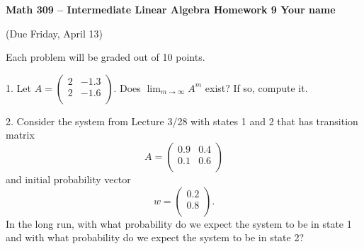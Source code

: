 \documentclass[12pt]{article} %
\begin{document}
 
\noindent
\textbf{Math 309 -- Intermediate Linear Algebra \quad 
Homework 9 \hfill Your name}\\
\begin{center}
  (Due Friday, April 13)
\end{center}
\medskip

Each problem will be graded out of 10 points.

\vspace{1cm}

\begin{flushleft}

1.  Let $A = \left(\begin{matrix}
                    2 & -1.3 \\
                    2 & -1.6\\
                   \end{matrix}\right).$  Does $\lim_{m \to \infty}\limits A^m$ exist?  If so, compute it.\\
                   
\vspace{.5cm}                   

2.  Consider the system from Lecture 3/28 with states 1 and 2 that has transition matrix \[A = \left(\begin{matrix}
                                                                                                      0.9 & 0.4 \\
                                                                                                      0.1 & 0.6\\
                                                                                                     \end{matrix}\right)\]
 and initial probability vector \[w = \left(\begin{matrix}
                                            0.2 \\
                                            0.8\\
                                           \end{matrix}\right).\]
 In the long run, with what probability do we expect the system to be in state 1 and with what probability do we expect the system to be in state 2?\\                                                                                                                                               


\vspace{.8cm}


\end{flushleft}
\end{document}
